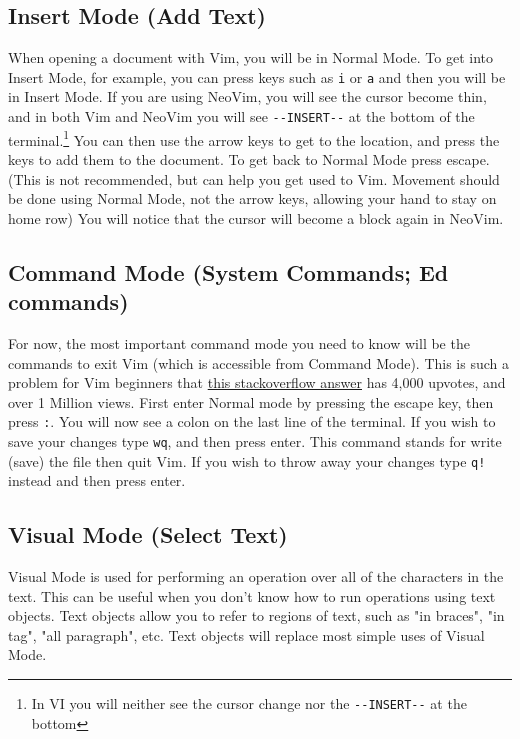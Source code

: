 \documentclass[11pt]{article}
\begin{document}
\subsection{Insert Mode (Add Text)}
\label{sec:org23c5006}
When opening a document with Vim, you will be in Normal Mode. To get into Insert
Mode, for example, you can press keys such as \texttt{i} or \texttt{a} and then you will be in
Insert Mode. If you are using NeoVim, you will see the cursor become thin, and
in both Vim and NeoVim you will see \texttt{-{}-INSERT-{}-} at the bottom of the
terminal.\footnote{In VI you will neither see the cursor change nor the \texttt{-{}-INSERT-{}-} at the bottom} You can then use the arrow keys to get to the location, and
press the keys to add them to the document. To get back to Normal Mode press
escape. (This is not recommended, but can help you get used to Vim. Movement
should be done using Normal Mode, not the arrow keys, allowing your hand to stay
on home row) You will notice that the cursor will become a block again in
NeoVim.
\subsection{Command Mode (System Commands; Ed commands)}
\label{sec:orgdbcddce}
For now, the most important command mode you need to know will be the commands
to exit Vim (which is accessible from Command Mode). This is such a problem for
Vim beginners that \href{https://stackoverflow.com/questions/11828270/how-to-exit-the-vim-editor}{this stackoverflow answer} has 4,000 upvotes, and over 1
Million views. First enter Normal mode by pressing the escape key, then press
\texttt{:}. You will now see a colon on the last line of the terminal. If you wish to
save your changes type \texttt{wq}, and then press enter. This command stands for write
(save) the file then quit Vim. If you wish to throw away your changes type \texttt{q!}
instead and then press enter.
\subsection{Visual Mode (Select Text)}
\label{sec:org507e51c}
Visual Mode is used for performing an operation over all of the characters in
the text. This can be useful when you don't know how to run operations using
text objects. Text objects allow you to refer to regions of text, such as "in
braces", "in tag", "all paragraph", etc. Text objects will replace most simple
uses of Visual Mode.
\end{document}
